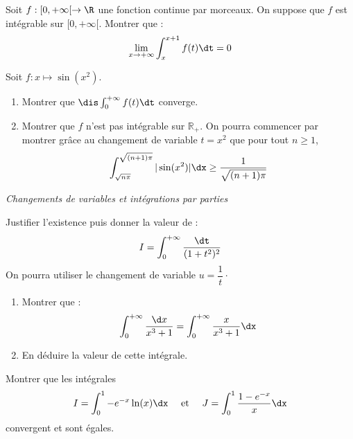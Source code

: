 \documentclass[a4paper,10pt]{report}
\begin{document}
\begin{Exercice}{}  Soit $f :[0, + \infty[ \rightarrow \R$ une fonction continue par morceaux.  On suppose que $f$ est intégrable sur $[0, + \infty[$.  Montrer que :
  \[
  \lim_{x \rightarrow + \infty} \int_{x}^{x + 1} f(t) \dt =0 
  \]
\end{Exercice}



\begin{Exercice}{}
Soit $f : x \mapsto \sin(x^2)$.
\begin{enumerate}
\item Montrer que $\dis \int_{0}^{+ \infty}  f(t) \dt$ converge.
\item Montrer que $f$ n'est pas intégrable sur $\mathbb{R}_+$. On pourra commencer par montrer grâce au changement de variable $t=x^2$ que pour tout $n \geq 1$,
$$ \int_{\sqrt{n \pi}}^{\sqrt{(n+1)\pi}} \vert \sin(x^2) \vert \dx \geq \frac{1}{\sqrt{(n+1) \pi}}$$
\end{enumerate}
\end{Exercice}


\medskip

\begin{center}
\textit{{ {\large Changements de variables et intégrations par parties}}}
\end{center}

\medskip


\begin{Exercice}{} Justifier l'existence puis donner la valeur de :
  \[
  I = \int_{0}^{ + \infty} \frac{\dt}{(1 + t^{2})^{2}}
  \]
On pourra utiliser le changement de variable $u = \dfrac{1}{t} \cdot$
\end{Exercice}


\begin{Exercice}{}
\begin{enumerate}
  \item
    Montrer que :
    \[
\int_{0}^{ + \infty} \frac{\d x}{x^{3} + 1} = \int_{0}^{ + \infty} \frac{x}{x^{3} + 1}\dx
    \]
  \item
    En déduire la valeur de cette intégrale.
  \end{enumerate}
\end{Exercice} 





\begin{Exercice}{} Montrer que les intégrales 
$$ I=\int_{0}^1 -e^{-x} \ln(x) \dx \quad \hbox{ et } \quad J= \int_{0}^1 \frac{1-e^{-x}}{x} \dx$$
convergent et sont égales.
\end{Exercice}
\end{document}
